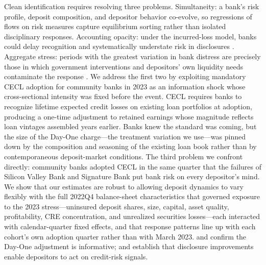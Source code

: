 Clean identification requires resolving three problems.  Simultaneity: a
bank's risk profile, deposit composition, and depositor behavior
co-evolve, so regressions of flows on risk measures capture equilibrium
sorting rather than isolated disciplinary responses.  Accounting
opacity: under the incurred-loss model, banks could delay recognition
and systematically understate risk in disclosures
\citep{bushman2012accounting, bushman2015delayed}.  Aggregate stress:
periods with the greatest variation in bank distress are precisely those
in which government interventions and depositors' own liquidity needs
contaminate the response \citep{bennett2015market}.  We address the
first two by exploiting mandatory CECL adoption for community banks in
2023 as an information shock whose cross-sectional intensity was fixed
before the event.  CECL requires banks to recognize lifetime expected
credit losses on existing loan portfolios at adoption, producing a
one-time adjustment to retained earnings whose magnitude reflects loan
vintages assembled years earlier.  Banks knew the standard was coming,
but the size of the Day-One charge---the treatment variation we
use---was pinned down by the composition and seasoning of the existing
loan book rather than by contemporaneous deposit-market conditions.
The third problem we confront directly: community banks adopted CECL in
the same quarter that the failures of Silicon Valley Bank and Signature
Bank put bank risk on every depositor's mind.  We show that our
estimates are robust to allowing deposit dynamics to vary flexibly with
the full 2022Q4 balance-sheet characteristics that governed exposure to
the 2023 stress---uninsured deposit shares, size, capital, asset
quality, profitability, CRE concentration, and unrealized securities
losses---each interacted with calendar-quarter fixed effects, and that
response patterns line up with each cohort's own adoption quarter rather
than with March 2023.  \citet{kim2026current} and \citet{gee2022decision}
confirm the Day-One adjustment is informative;
\citet{nier2006market} and \citet{chen2022bank} establish that
disclosure improvements enable depositors to act on credit-risk signals.

